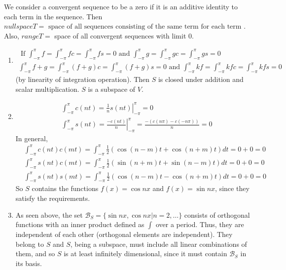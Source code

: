 \documentclass[twoside]{amsart}
\theoremstyle{plain}
\theoremstyle{definition}
\newcommand{\exercisehead}[1]
  {
   \noindent{\small\bf Exercise #1.}
   \smallskip}
\begin{document}
We consider a convergent sequence to be a zero if it is an additive identity to each term in the sequence.  Then $nullspace T = \text{ space of all sequences consisting of the same term for each term }$.  Also, $range T =$ space of all convergent sequences with limit $0$. 

\exercisehead{29} 
\begin{enumerate}
\item \[
\begin{gathered}
  \text{ If } \int_{-\pi}^{\pi} f = \int_{-\pi}^{\pi} fc = \int_{-\pi}^{\pi} fs = 0 \text{ and } \int_{-\pi}^{\pi} g = \int_{-\pi}^{\pi} gc = \int_{-\pi}^{\pi} gs = 0 \\
  \int_{-\pi}^{\pi} f +g = \int_{-\pi}^{\pi} (f+g)c = \int_{-\pi}^{\pi} (f+g)s = 0 \text{ and } \int_{-\pi}^{\pi} kf = \int_{-\pi}^{\pi} kfc = \int_{-\pi}^{\pi} kfs = 0 
\end{gathered}
\]
(by linearity of integration operation).  Then $S$ is closed under addition and scalar multiplication.  $S$ is a subspace of $V$.  
\item \[
\begin{aligned}
  & \int_{-\pi}^{\pi} c(nt) = \left. \frac{1}{n} s(nt) \right|_{-\pi}^{\pi} = 0  \\
  & \int_{-\pi}^{\pi} s(nt) = \left. \frac{-c(nt)}{n} \right|_{-\pi}^{\pi} = \frac{ - (c(n\pi) - c(-n\pi))}{n} = 0 
\end{aligned}
\]
In general,
\[
\begin{aligned}
 & \int_{-\pi}^{\pi} c(nt) c(mt) = \int_{-\pi}^{\pi} \frac{1}{2} (\cos{(n-m)t} + \cos{(n+m)t} ) dt = 0 + 0 = 0  \\
 & \int_{-\pi}^{\pi} s(nt) c(mt) = \int_{-\pi}^{\pi} \frac{1}{2} (\sin{(n+m)t} + \sin{(n-m)t} ) dt = 0 + 0 = 0 \\
 & \int_{-\pi}^{\pi} s(nt) s(mt) = \int_{-\pi}^{\pi} \frac{1}{2} (\cos{(n-m)t} - \cos{(n+m)t} ) dt = 0 + 0 = 0 
\end{aligned}
\]
So $S$ contains the functions $f(x) = \cos{nx}$ and $f(x) = \sin{nx}$, since they satisfy the requirements.  
\item As seen above, the set $\mathcal{B}_S = \{ \sin{nx},\cos{nx} | n = 2, \dots \}$ consists of orthogonal functions with an inner product defined as $\int$ over a period.  Thus, they are independent of each other (orthogonal elements are independent).  They belong to $S$ and $S$, being a subspace, must include all linear combinations of them, and so $S$ is at least infinitely dimensional, since it must contain $\mathcal{B}_S$ in its basis.  

\end{enumerate}
\end{document}
